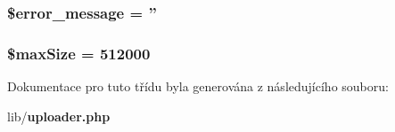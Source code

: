 \subsubsection[{\$error\_\-message}]{\setlength{\rightskip}{0pt plus 5cm}\$error\_\-message = ''}\label{d4/d3b/class_uploader_ae838cbd355959defbd4d49d0fbe7b273}
\subsubsection[{\$maxSize}]{\setlength{\rightskip}{0pt plus 5cm}\$maxSize = 512000\hspace{0.3cm}{\ttfamily  [private]}}\label{d4/d3b/class_uploader_a3c08c15291d9d6190bc87540b3e4d11b}


Dokumentace pro tuto třídu byla generována z následujícího souboru:\begin{DoxyCompactItemize}
\item 
lib/{\bf uploader.php}\end{DoxyCompactItemize}
